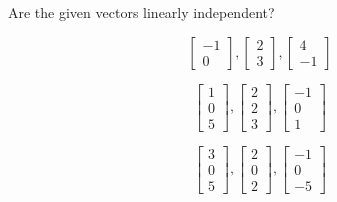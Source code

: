 \documentclass{ximera}
\begin{document}
\begin{problem} Are the given vectors linearly independent?

\begin{problem}
$$\begin{bmatrix}-1\\0\end{bmatrix}, \begin{bmatrix}2\\3\end{bmatrix},\begin{bmatrix}4\\-1\end{bmatrix}$$

\begin{multipleChoice}
 \end{multipleChoice}
\end{problem}

\begin{problem}
$$\begin{bmatrix}1\\0\\5\end{bmatrix}, \begin{bmatrix}2\\2\\3\end{bmatrix},\begin{bmatrix}-1\\0\\1\end{bmatrix}$$

\begin{multipleChoice}
 \end{multipleChoice}

\end{problem}

\begin{problem}
$$\begin{bmatrix}3\\0\\5\end{bmatrix}, \begin{bmatrix}2\\0\\2\end{bmatrix},\begin{bmatrix}-1\\0\\-5\end{bmatrix}$$


\end{problem}
\end{problem}
\end{document}
